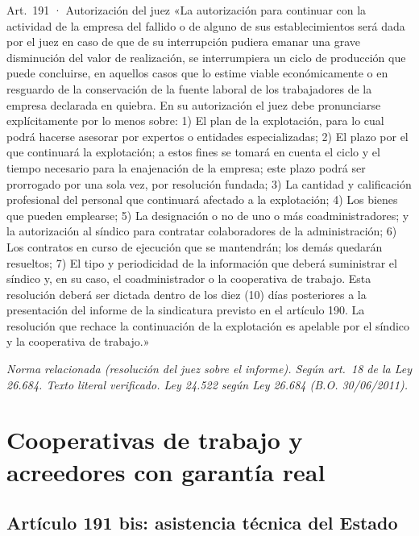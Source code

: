 \documentclass[12pt,oneside]{book}
\begin{document}
\begin{norma}{Art.~191 · Autorización del juez}
«La autorización para continuar con la actividad de la empresa del fallido o de alguno de sus establecimientos será dada por el juez en caso de que de su interrupción pudiera emanar una grave disminución del valor de realización, se interrumpiera un ciclo de producción que puede concluirse, en aquellos casos que lo estime viable económicamente o en resguardo de la conservación de la fuente laboral de los trabajadores de la empresa declarada en quiebra. En su autorización el juez debe pronunciarse explícitamente por lo menos sobre: 1) El plan de la explotación, para lo cual podrá hacerse asesorar por expertos o entidades especializadas; 2) El plazo por el que continuará la explotación; a estos fines se tomará en cuenta el ciclo y el tiempo necesario para la enajenación de la empresa; este plazo podrá ser prorrogado por una sola vez, por resolución fundada; 3) La cantidad y calificación profesional del personal que continuará afectado a la explotación; 4) Los bienes que pueden emplearse; 5) La designación o no de uno o más coadministradores; y la autorización al síndico para contratar colaboradores de la administración; 6) Los contratos en curso de ejecución que se mantendrán; los demás quedarán resueltos; 7) El tipo y periodicidad de la información que deberá suministrar el síndico y, en su caso, el coadministrador o la cooperativa de trabajo. Esta resolución deberá ser dictada dentro de los diez (10) días posteriores a la presentación del informe de la sindicatura previsto en el artículo 190. La resolución que rechace la continuación de la explotación es apelable por el síndico y la cooperativa de trabajo.»

\par\smallskip\textit{Norma relacionada (resolución del juez sobre el informe). Según art.~18 de la Ley 26.684. Texto literal verificado. Ley 24.522 según Ley 26.684 (B.O. 30/06/2011).}
\end{norma}

\section{Cooperativas de trabajo y acreedores con garantía real}

\subsection{Artículo 191 bis: asistencia técnica del Estado}
\end{document}
